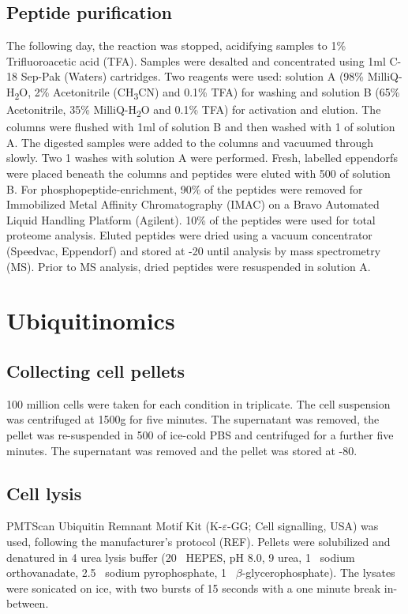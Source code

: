 \subsection{Peptide purification}
The following day, the reaction was stopped, acidifying samples to 1\% Trifluoroacetic acid (TFA).
Samples were desalted and concentrated using 1ml C-18 Sep-Pak (Waters) cartridges.
Two reagents were used: solution A (98\% MilliQ-H\textsubscript{2}O, 2\% Acetonitrile (CH\textsubscript{3}CN) and 0.1\% TFA) for washing and solution B (65\% Acetonitrile, 35\% MilliQ-H\textsubscript{2}O and 0.1\% TFA) for activation and elution.
The columns were flushed with 1ml of solution B and then washed with 1\ml{} of solution A.
The digested samples were added to the columns and vacuumed through slowly.
Two 1\ml{} washes with solution A were performed.
Fresh, labelled eppendorfs were placed beneath the columns and peptides were eluted with 500\ul{} of solution B.
For phosphopeptide-enrichment, 90\% of the peptides were removed for Immobilized Metal Affinity Chromatography (IMAC) on a Bravo Automated Liquid Handling Platform (Agilent).
10\% of the peptides were used for total proteome analysis.
Eluted peptides were dried using a vacuum concentrator (Speedvac, Eppendorf) and stored at -20\C{} until analysis by mass spectrometry (MS).
Prior to MS analysis, dried peptides were resuspended in solution A.

\section{Ubiquitinomics}
%
\subsection{Collecting cell pellets}
100 million cells were taken for each condition in triplicate.
The cell suspension was centrifuged at 1500g for five minutes.
The supernatant was removed, the pellet was re-suspended in 500\ul{} of ice-cold PBS and centrifuged for a further five minutes.
The supernatant was removed and the pellet was stored at -80\C{}.

\subsection{Cell lysis}
PMTScan Ubiquitin Remnant Motif Kit (K-$\varepsilon$-GG; Cell signalling, USA) was used, following the manufacturer's protocol (REF).
Pellets were solubilized and denatured in 4\ml{} urea lysis buffer (20\si{\milli\Molar} HEPES, pH 8.0, 9\si{\Molar} urea, 1\si{\milli\Molar} sodium orthovanadate, 2.5\si{\milli\Molar} sodium pyrophosphate, 1\si{\milli\Molar} $\beta$-glycerophosphate).
The lysates were sonicated on ice, with two bursts of 15 seconds with a one minute break in-between.

